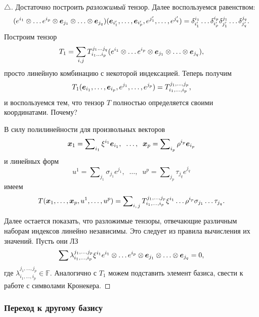 \begin{proof}[$\triangle$]
Достаточно построить \textit{разложимый} тензор. Далее воспользуемся равенством:
$$
    (e^{i_{1}} \otimes \ldots e^{i_p} \otimes \mbox{\boldmath $e$}_{j_{1}} \otimes \ldots \otimes \mbox{\boldmath $e$}_{j_q}) (\mbox{\boldmath $e$}_{i_{1}'},  \ldots,  \mbox{\boldmath $e$}_{i_p'}, e^{j_1'}, \ldots,  e^{j_q'}) =
     \delta_{i_1'}^{i_{1}} \ldots \delta_{i_p'}^{i_{p}}
     \delta_{j_1'}^{j_{1}} \ldots \delta_{j_q'}^{j_{q}}.
$$
Построим тензор
$$
    T_{1} = \sum_{i, j} T_{i_1 \ldots i_p}^{j_1 \ldots  j_q} 
    (e^{i_{1}} \otimes \ldots e^{i_p} \otimes \mbox{\boldmath $e$}_{j_{1}} \otimes \ldots \otimes \mbox{\boldmath $e$}_{j_q}),
$$
просто линейную комбинацию с некоторой индексацией. Теперь получим
\begin{equation*}
    T_1(\mbox{\boldmath $e$}_{i_1}, \dots, \mbox{\boldmath $e$}_{i_p}, e^{j_1}, \dots, e^{j_p}) = T_{i_1, \dots, i_p}^{j_1, \dots, j_p},
\end{equation*}
и воспользуемся тем, что тензор $T$ полностью определяется своими координатами. Почему? 

В силу полилинейности для произвольных векторов
$$
    \mbox{\boldmath $x$}_{1} = \sum\nolimits_{i_{1}} \xi^{i_{1}} \mbox{\boldmath $e$}_{i_{1}}, \; \;
    \ldots, \; \;
    \mbox{\boldmath $x$}_p = \sum\nolimits_{i_p} \rho^{i_p} \mbox{\boldmath $e$}_{i_p}
$$
и линейных форм
$$
    u^1 = \sum\nolimits_{j_{1}} \sigma_{j_{1}} e^{j_{1}}, \; \;
    \ldots, \; \;
    u^p = \sum\nolimits_{j_p} \tau_{j_q} e^{j_q}
$$
имеем
$$
    T(\mbox{\boldmath $x$}_{1}, \ldots,  \mbox{\boldmath $x$}_p, u^1, \ldots,  u^p) = \sum\nolimits_{i, \, j}
    T_{i_1, \dots, i_p}^{j_1, \dots, j_p} \xi^{i_{1}} \ldots \rho^{i_p} \sigma_{j_{1}} \ldots \tau_{j_q}.
$$


Далее остается показать, что разложимые тензоры, отвечающие различным наборам индексов линейно независимы. Это следует из правила вычисления их значений. Пусть они ЛЗ
$$
    \sum \lambda_{i_1, \dots, i_p}^{j_1, \dots, j_p} \xi^{i_{1}} 
    e^{i_{1}} \otimes \ldots e^{i_p} \otimes \mbox{\boldmath $e$}_{j_{1}} \otimes \ldots \otimes \mbox{\boldmath $e$}_{j_q} = 0,
$$
где $\lambda_{i_1, \dots, i_p}^{j_1, \dots, j_p} \in \mathbb{F}$. Аналогично с $T_1$ можем подставить элемент базиса, свести к работе с символами Кронекера. 

\end{proof}


\subsubsection{Переход к другому базису}

